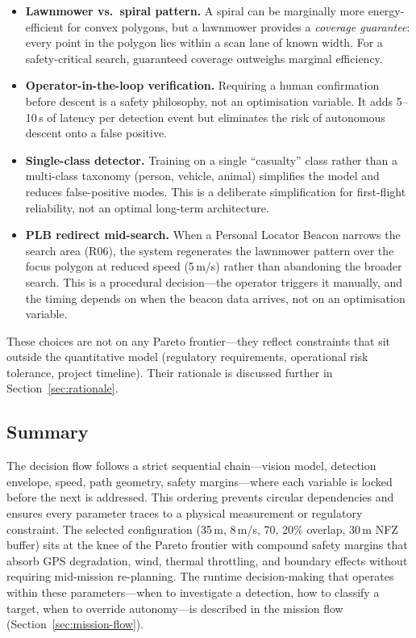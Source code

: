 \begin{itemize}[nosep]
  \item \textbf{Lawnmower vs.\ spiral pattern.} A spiral can be marginally more energy-efficient for convex polygons, but a lawnmower provides a \emph{coverage guarantee}: every point in the polygon lies within a scan lane of known width. For a safety-critical search, guaranteed coverage outweighs marginal efficiency.
  \item \textbf{Operator-in-the-loop verification.} Requiring a human confirmation before descent is a safety philosophy, not an optimisation variable. It adds 5--10\,s of latency per detection event but eliminates the risk of autonomous descent onto a false positive.
  \item \textbf{Single-class detector.} Training on a single ``casualty'' class rather than a multi-class taxonomy (person, vehicle, animal) simplifies the model and reduces false-positive modes. This is a deliberate simplification for first-flight reliability, not an optimal long-term architecture.
  \item \textbf{PLB redirect mid-search.} When a Personal Locator Beacon narrows the search area (R06), the system regenerates the lawnmower pattern over the focus polygon at reduced speed (5\,m/s) rather than abandoning the broader search. This is a procedural decision---the operator triggers it manually, and the timing depends on when the beacon data arrives, not on an optimisation variable.
\end{itemize}

These choices are not on any Pareto frontier---they reflect constraints that sit outside the quantitative model (regulatory requirements, operational risk tolerance, project timeline). Their rationale is discussed further in Section~\ref{sec:rationale}.

\subsection{Summary}\label{sec:df-summary}

The decision flow follows a strict sequential chain---vision model, detection envelope, speed, path geometry, safety margins---where each variable is locked before the next is addressed. This ordering prevents circular dependencies and ensures every parameter traces to a physical measurement or regulatory constraint. The selected configuration (35\,m, 8\,m/s, 70\textdegree, 20\% overlap, 30\,m NFZ buffer) sits at the knee of the Pareto frontier with compound safety margins that absorb GPS degradation, wind, thermal throttling, and boundary effects without requiring mid-mission re-planning. The runtime decision-making that operates within these parameters---when to investigate a detection, how to classify a target, when to override autonomy---is described in the mission flow (Section~\ref{sec:mission-flow}).
